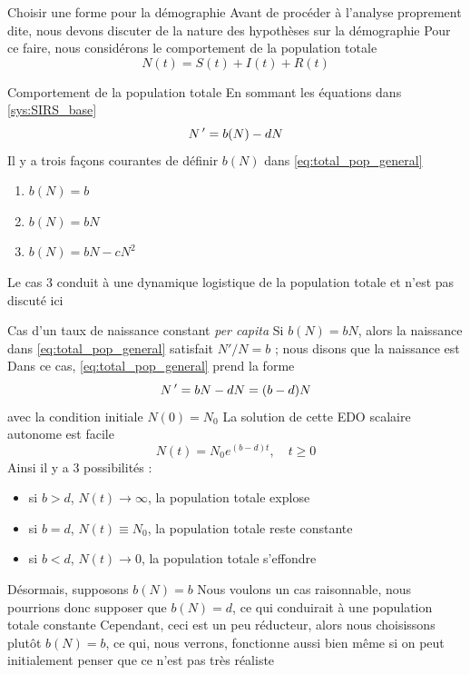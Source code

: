 \documentclass[aspectratio=169]{beamer}\usepackage[]{graphicx}\usepackage[]{xcolor}
\begin{document}
\begin{frame}{Choisir une forme pour la démographie}
Avant de procéder à l'analyse proprement dite, nous devons discuter de la nature des hypothèses sur la démographie
\vfill
Pour ce faire, nous considérons le comportement de la population totale 
\[
N(t)=S(t)+I(t)+R(t)
\]
\end{frame}

\begin{frame}{Comportement de la population totale}
En sommant les équations dans \eqref{sys:SIRS_base}
\begin{equation}\label{eq:total_pop_general}
N\,'=b(N)-dN
\end{equation}
\vfill
Il y a trois façons courantes de définir $b(N)$ dans \eqref{eq:total_pop_general}
\begin{enumerate}
\item $b(N)=b$
\item $b(N)=bN$
\item $b(N)=bN-cN^2$
\end{enumerate}
\vfill
Le cas 3 conduit à une dynamique logistique de la population totale et n'est pas discuté ici
\end{frame}


\begin{frame}{Cas d'un taux de naissance constant \emph{per capita}}
Si $b(N)=bN$, alors la naissance dans \eqref{eq:total_pop_general} satisfait $N'/N=b$ ; nous disons que la naissance est 
\vfill
Dans ce cas, \eqref{eq:total_pop_general} prend la forme
\[
N\,'=bN-dN=(b-d)N
\]
avec la condition initiale $N(0)=N_0$
\vfill
La solution de cette EDO scalaire autonome est facile
\[
N(t)=N_0e^{(b-d)t},\quad t\geq 0
\]
Ainsi il y a 3 possibilités :
\begin{itemize}
  \item si $b>d$, $N(t)\to\infty$, la population totale explose
  \item si $b=d$, $N(t)\equiv N_0$, la population totale reste constante
  \item si $b<d$, $N(t)\to 0$, la population totale s'effondre
\end{itemize}
\end{frame}

\begin{frame}{Désormais, supposons $b(N)=b$}
\bbullet Nous voulons un cas raisonnable, nous pourrions donc supposer que $b(N)=d$, ce qui conduirait à une population totale constante
\vfill
\bbullet Cependant, ceci est un peu réducteur, alors nous choisissons plutôt $b(N)=b$, ce qui, nous verrons, fonctionne aussi bien même si on peut initialement penser que ce n'est pas très réaliste
\end{frame}
\end{document}
